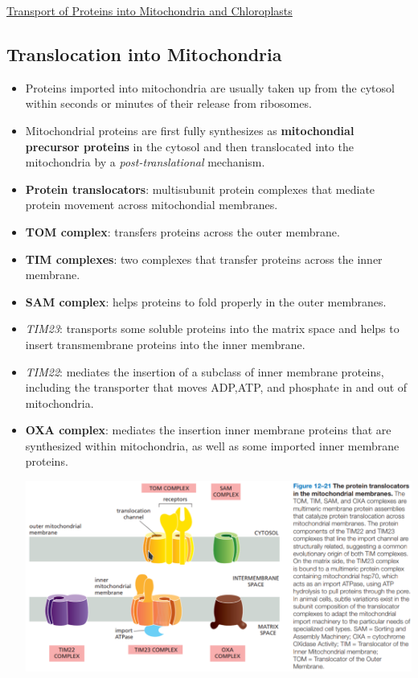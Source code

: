 \documentclass[12pt,letterpaper]{article}
\begin{document}
\hypertarget{12.3}{}
\begin{secbox}{\hyperlink{12}{Transport of Proteins into Mitochondria and Chloroplasts}}{
    \hypertarget{12.3.1}{\subsection*{Translocation into Mitochondria}}
    \begin{itemize}
        \item Proteins imported into mitochondria are usually taken up from the cytosol within seconds or minutes of their release from ribosomes.
        \item Mitochondrial proteins are first fully synthesizes as \textbf{mitochondial precursor proteins} in the cytosol and then translocated into the mitochondria by a \textit{post-translational} mechanism.
        \item \textbf{Protein translocators}: multisubunit protein complexes that mediate protein movement across mitochondial membranes.
        \item \textbf{TOM complex}: transfers proteins across the outer membrane.
        \item \textbf{TIM complexes}: two complexes that transfer proteins across the inner membrane.
        \item \textbf{SAM complex}: helps proteins to fold properly in the outer membranes.
        \item \textit{TIM23}: transports some soluble proteins into the matrix space and helps to insert transmembrane proteins into the inner membrane.
        \item \textit{TIM22}: mediates the insertion of a subclass of inner membrane proteins, including the transporter that moves ADP,ATP, and phosphate in and out of mitochondria.
        \item \textbf{OXA complex}: mediates the insertion inner membrane proteins that are synthesized within mitochondria, as well as some imported inner membrane proteins.\par 
        \includegraphics[width=\linewidth]{images/fig12-21.png}
    \end{itemize}
        

}
\end{secbox}
\end{document}
